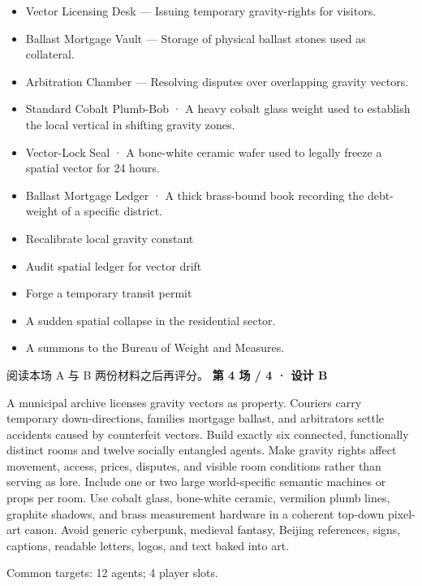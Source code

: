 \documentclass[10pt,a4paper]{article}
\newcommand{\heading}[1]{\par\vspace{5pt}{\color{teal}\bfseries #1}\par}
\begin{document}
\begin{minipage}[t]{0.48\linewidth}\fontsize{9}{12}\selectfont\raggedright\setlength{\parskip}{0pt}
\heading{地点与用途}\begin{itemize}
\item Vector Licensing Desk — Issuing temporary gravity-rights for visitors.
\item Ballast Mortgage Vault — Storage of physical ballast stones used as collateral.
\item Arbitration Chamber — Resolving disputes over overlapping gravity vectors.
\end{itemize}
\heading{物件}\begin{itemize}
\item Standard Cobalt Plumb-Bob · A heavy cobalt glass weight used to establish the local vertical in shifting gravity zones.
\item Vector-Lock Seal · A bone-white ceramic wafer used to legally freeze a spatial vector for 24 hours.
\item Ballast Mortgage Ledger · A thick brass-bound book recording the debt-weight of a specific district.
\end{itemize}
\heading{可能采取的行动}\begin{itemize}
\item Recalibrate local gravity constant
\item Audit spatial ledger for vector drift
\item Forge a temporary transit permit
\end{itemize}
\heading{玩家进入方式}\begin{itemize}
\item A sudden spatial collapse in the residential sector.
\item A summons to the Bureau of Weight and Measures.
\end{itemize}
\end{minipage}
\vfill\small 阅读本场 A 与 B 两份材料之后再评分。
\clearpage
{\Large\bfseries 第 4 场 / 4 · 设计 B}\par
\heading{共同生成要求}
{\small A municipal archive licenses gravity vectors as property. Couriers carry temporary down-directions, families mortgage ballast, and arbitrators settle accidents caused by counterfeit vectors. Build exactly six connected, functionally distinct rooms and twelve socially entangled agents. Make gravity rights affect movement, access, prices, disputes, and visible room conditions rather than serving as lore. Include one or two large world-specific semantic machines or props per room. Use cobalt glass, bone-white ceramic, vermilion plumb lines, graphite shadows, and brass measurement hardware in a coherent top-down pixel-art canon. Avoid generic cyberpunk, medieval fantasy, Beijing references, signs, captions, readable letters, logos, and text baked into art.

Common targets: 12 agents; 4 player slots.}\par\vspace{6pt}
\end{document}
